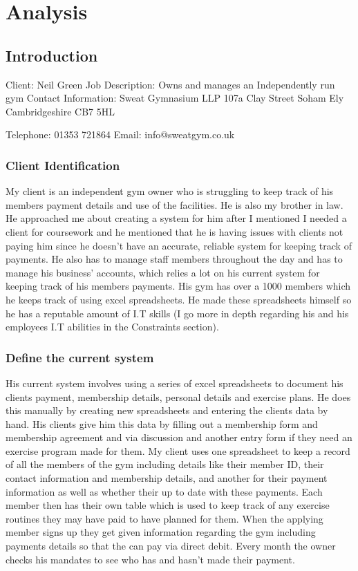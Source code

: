 \chapter{Analysis}

\section{Introduction}

Client: Neil Green
Job Description: Owns and manages an Independently run gym
Contact Information: Sweat Gymnasium LLP
					 107a Clay Street
					 Soham
					 Ely
					 Cambridgeshire
					 CB7 5HL

					 Telephone: 01353 721864
					 Email: info@sweatgym.co.uk

\subsection{Client Identification}

My client is an independent gym owner who is struggling to keep track of his members payment details and use of the facilities. He is also my brother in law. He approached me about creating a system for him after I mentioned I needed a client for coursework and he mentioned that he is having issues with clients not paying him since he doesn't have an accurate, reliable system for keeping track of payments. He also has to manage staff members throughout the day and has to manage his business' accounts, which relies a lot on his current system for keeping track of his members payments. His gym has over a 1000 members which he keeps track of using excel spreadsheets. He made these spreadsheets himself so he has a reputable amount of I.T skills (I go more in depth regarding his and his employees I.T abilities in the Constraints section). 

\subsection{Define the current system}

His current system involves using a series of excel spreadsheets to document his clients payment, membership details, personal details and exercise plans. He does this manually by creating new spreadsheets and entering the clients data by hand. His clients give him this data by filling out a membership form and membership agreement and via discussion and another entry form if they need an exercise program made for them. My client uses one spreadsheet to keep a record of all the members of the gym including details like their member ID, their contact information and membership details, and another for their payment information  as well as whether their up to date with these payments. Each member then has their own table which is used to keep track of any exercise routines they may have paid to have planned for them. When the applying member signs up they get given information regarding the gym including payments details so that the can pay via direct debit. Every month the owner checks his mandates to see who has and hasn't made their payment.   

